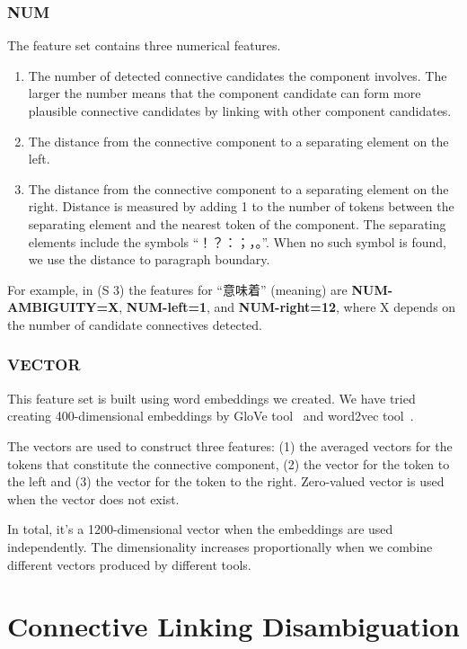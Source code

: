 \subsubsection{NUM}

The feature set contains three numerical features.

\begin{enumerate}
    \item The number of detected connective candidates the component involves. The larger
        the number means that the component candidate can form more plausible connective
        candidates by linking with other component candidates.
    \item The distance from the connective component to a separating element on the left.
    \item The distance from the connective component to a
        separating element on the right. Distance is measured by adding 1 to the number of tokens
        between the separating element and the nearest token of the component.
        The separating elements include the symbols ``！？：；，。''.
        When no such symbol is found, we use the distance to paragraph boundary.
\end{enumerate}

For example, in (S 3) the features for “意味着” (meaning) are \textbf{NUM-AMBIGUITY=X},
\textbf{NUM-left=1}, and \textbf{NUM-right=12}, where X depends on the number of candidate
connectives detected.


\subsubsection{VECTOR}

This feature set is built using word embeddings we created.
We have tried creating 400-dimensional embeddings by GloVe tool~\citep{pennington2014glove}
and word2vec tool~\citep{mikolov2013efficient,mikolov2013distributed}.

The vectors are used to construct three features: (1) the averaged vectors
for the tokens that constitute the connective component, (2) the vector for the
token to the left and (3) the vector for the token to the right. Zero-valued vector is used
when the vector does not exist.

In total, it's a 1200-dimensional vector when the embeddings are used independently.
The dimensionality increases proportionally when we combine different vectors produced by
different tools.


\section{Connective Linking Disambiguation}

